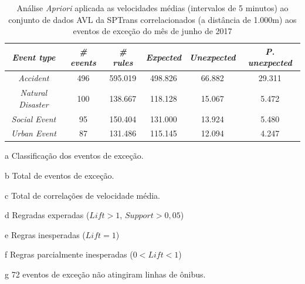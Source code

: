 \documentclass[
	12pt,				%
	oneside,			%
	a4paper,			%
	english,			%
	brazil				%
	]{abntex2ppgsi}
\begin{document}
{{\begin{apendicesenv}
\begin{table}[!htb]
\centering
\begin{threeparttable}
\caption {Análise \textit{Apriori} aplicada as velocidades médias (intervalos de 5 minutos) ao conjunto de dados AVL da SPTrans correlacionados (a distância de 1.000m) aos eventos de exceção do mês de junho de 2017}
\label {tab:aprioriFull}
\begin{tabular}{c|c|c|c|c|c}
\hline
\textbf{\textit{Event type}}\tnote{a} & \textbf{\textit{\# events}}\tnote{b} & \textit{\textbf{\# rules}}\tnote{c} & \textbf{\textit{Expected}}\tnote{d} & \textbf{\textit{Unexpected}}\tnote{e} & \textbf{\textit{P. unexpected}}\tnote{f}   \\
\hline
\textit{Accident} & 496 & 595.019 & 498.826 & 66.882 & 29.311 \\
\textit{Natural Disaster} & 100 & 138.667 & 118.128 & 15.067 & 5.472 \\
\textit{Social Event} & 95 & 150.404 & 131.000 & 13.924 & 5.480 \\
\textit{Urban Event} & 87 & 131.486 & 115.145 & 12.094 & 4.247 \\
\hline
\end{tabular}
\begin{tablenotes}
            \item[a] Classificação dos eventos de exceção.
            \item[b] Total de eventos de exceção.
            \item[c] Total de correlações de velocidade média.
            \item[d] Regradas experadas ($Lift > 1$, $Support > 0,05$)
            \item[e] Regras inesperadas ($Lift = 1$)
            \item[f] Regras parcialmente inesperadas ($0 < Lift < 1$)
            \item[g] 72 eventos de exceção não atingiram linhas de ônibus.
        \end{tablenotes}
\end{threeparttable}
\end{table}



\end{apendicesenv}}}
\end{document}
